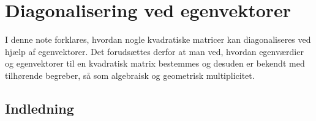 
\setcounter{chapter}{9} %


\chapter{Diagonalisering ved egenvektorer} \label{tn10}

\begin{basis}
I denne note forklares, hvordan nogle kvadratiske matricer kan diagonaliseres ved hjælp af egenvektorer. Det forudsættes derfor at man ved, hvordan egenværdier og egenvektorer til en kvadratisk matrix bestemmes og desuden er bekendt med tilhørende begreber, så som algebraisk og geometrisk multiplicitet. 
\end{basis}

\section{Indledning}

